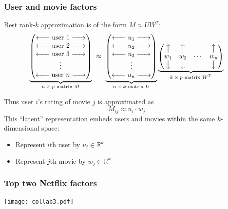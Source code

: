 \documentclass[smaller,handout]{beamer}
\def\R{{\mathbb R}}
\def\darkred{\color{red!70!black}}
\def\darkgreen{\color{green!60!black}}
\def\vone{{\vskip.1in}}
\def\R{{\mathbb R}}
\begin{document}
\begin{frame}
\frametitle{User and movie factors}

Best rank-$k$ approximation is of the form $M \approx U W^T$:
$$
\underbrace{\begin{pmatrix} 
\xleftarrow{\hspace*{.5cm}} \text{user 1} \xrightarrow{\hspace*{.5cm}} \\
\xleftarrow{\hspace*{.5cm}} \text{user 2} \xrightarrow{\hspace*{.5cm}} \\
\xleftarrow{\hspace*{.5cm}} \text{user 3} \xrightarrow{\hspace*{.5cm}} \\
\vdots \\
\xleftarrow{\hspace*{.5cm}} \text{user $n$} \xrightarrow{\hspace*{.5cm}} 
\end{pmatrix}}_{\text{$n \times p$ matrix $M$}}
\ \approx \ 
\underbrace{\begin{pmatrix}
\xleftarrow{\hspace*{0.5cm}} u_1 \xrightarrow{\hspace*{0.5cm}} \\
\xleftarrow{\hspace*{0.5cm}} u_2 \xrightarrow{\hspace*{0.5cm}} \\
\xleftarrow{\hspace*{0.5cm}} u_3 \xrightarrow{\hspace*{0.5cm}} \\
\vdots \\
\xleftarrow{\hspace*{0.5cm}} u_n \xrightarrow{\hspace*{0.5cm}} 
\end{pmatrix}}_{\text{$n \times k$ matrix $U$}}
\underbrace{\begin{pmatrix} 
\big\uparrow   & \big\uparrow  &        & \big\uparrow \\
w_1        & w_2       & \cdots & w_p       \\
\big\downarrow & \big\downarrow &       & \big\downarrow
\end{pmatrix}}_{\text{$k \times p$ matrix $W^T$}}
$$

\pause\vone
{\darkred Thus user $i$'s rating of movie $j$ is approximated as
$$ M_{ij} \approx u_i \cdot w_j $$}
\pause
{\darkgreen This ``latent'' representation embeds users and movies within the same $k$-dimensional space:}
\begin{itemize}
\item {\darkgreen Represent $i$th user by $u_i \in \R^k$}
\item {\darkgreen Represent $j$th movie by $w_j \in \R^k$}
\end{itemize}

\end{frame}

\begin{frame}
\frametitle{Top two Netflix factors}

\begin{center}
\texttt{[image: collab3.pdf]}
\end{center}

\end{frame}
\end{document}

